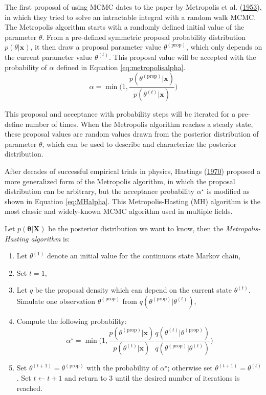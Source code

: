 \documentclass[12pt]{book}
\numberwithin{equation}{chapter}
\providecommand{\tightlist}{%
  \setlength{\itemsep}{0pt}\setlength{\parskip}{0pt}}
\begin{document}
The first proposal of using MCMC dates to the paper by Metropolis et al. (\protect\hyperlink{ref-metropolis1953equation}{1953}), in which they tried to solve an intractable integral with a random walk MCMC. The Metropolis algorithm starts with a randomly defined initial value of the parameter \(\theta\). From a pre-defined symmetric proposal probability distribution \(p(\theta | \mathbf{x})\), it then draw a proposal parameter value \(\theta^{(\text{prop})}\), which only depends on the current parameter value \(\theta^{(t)}\). This proposal value will be accepted with the probability of \(\alpha\) defined in Equation \eqref{eq:metropolisalpha}.
\begin{equation}
\alpha = \min\bigg(1, \frac{p(\theta^{(\text{prop})}|\mathbf{x})}{p(\theta^{(t)}|\mathbf{x})}\bigg)
\label{eq:metropolisalpha}
\end{equation}

This proposal and acceptance with probability steps will be iterated for a pre-define number of times. When the Metropolis algorithm reaches a steady state, these proposal values are random values drawn from the posterior distribution of parameter \(\theta\), which can be used to describe and characterize the posterior distribution.

After decades of successful empirical trials in physics, Hastings (\protect\hyperlink{ref-hastings1970monte}{1970}) proposed a more generalized form of the Metropolis algorithm, in which the proposal distribution can be arbitrary, but the acceptance probability \(\alpha^\star\) is modified as shown in Equation \eqref{eq:MHalpha}. This Metropolis-Hasting (MH) algorithm is the most classic and widely-known MCMC algorithm used in multiple fields.

Let \(p(\mathbf{\theta|X})\) be the posterior distribution we want to know, then the \emph{Metropolis-Hasting algorithm} is:

\begin{enumerate}
\def\labelenumi{\arabic{enumi}.}
\tightlist
\item
  Let \(\theta^{(1)}\) denote an initial value for the continuous state Markov chain,
\item
  Set \(t = 1\),
\item
  Let \(q\) be the proposal density which can depend on the current state \(\theta^{(t)}\). Simulate one observation \(\theta^{(\text{prop})}\) from \(q(\theta^{(\text{prop})} | \theta^{(t)})\),
\item
  Compute the following probability:
  \begin{equation}
  \alpha^\star = \min\bigg(1, \frac{p\left(\theta^{(\text{prop})} | \boldsymbol{x}\right)}{p\left(\theta^{(t)} | \boldsymbol{x}\right)} \frac{q\left(\theta^{(t)} | \theta^{(\text{prop})}\right)}{q\left(\theta^{(\text{prop})} | \theta^{(t)}\right)}\bigg)
  \label{eq:MHalpha}
  \end{equation}
\item
  Set \(\theta^{(t+1)} = \theta^{(\text{prop})}\) with the probability of \(\alpha^\star\); otherwise set \(\theta^{(t+1)} = \theta^{(t)}\). Set \(t \leftarrow t + 1\) and return to 3 until the desired number of iterations is reached.
\end{enumerate}
\end{document}
